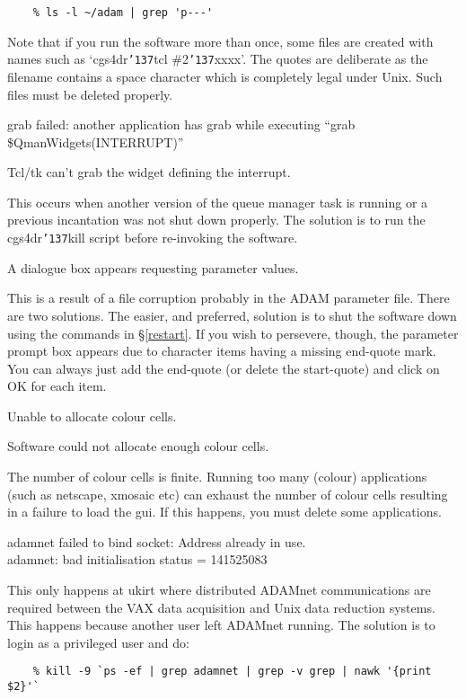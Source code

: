 \documentclass[a4paper]{book}
\renewcommand{\_}{{\tt\char'137}}
\begin{document}
\begin{description}
  \begin{verbatim}
    % ls -l ~/adam | grep 'p---'
  \end{verbatim}

  Note that if you run the software more than once, some files are created with names such as
  `cgs4dr\_tcl \#2\_xxxx'. The quotes are deliberate as the filename contains a space character
  which is completely legal under Unix. Such files must be deleted properly.

\item[{\bf \S}] {\sf grab failed: another application has grab while executing ``grab \$QmanWidgets(INTERRUPT)''}

  Tcl/tk can't grab the widget defining the interrupt.

  This occurs when another version of the queue manager task is running or a previous incantation was
  not shut down properly. The solution is to run the cgs4dr\_kill script before re-invoking the software.

\item[{\bf \S}] {\sf A dialogue box appears requesting parameter values.}

  This is a result of a file corruption probably in the ADAM parameter file.  There are two
  solutions. The easier, and preferred, solution is to shut the software down using the commands
  in \S \ref{restart}. If you wish to persevere, though, the parameter prompt box appears due to
  character items having a missing end-quote mark. You can always just add
  the end-quote (or delete the start-quote) and click on {\sf OK} for each item.

\item[{\bf \S}] {\sf Unable to allocate colour cells.}

  Software could not allocate enough colour cells.

  The number of colour cells is finite. Running too many (colour) applications (such as
  netscape, xmosaic etc) can exhaust the number of colour cells resulting in a failure
  to load the {\sc gui}. If this happens, you must delete some applications.

\item[{\bf \S}] {\sf adamnet failed to bind socket: Address already in use. \\
  adamnet: bad initialisation status = 141525083}

  This only happens at {\sc ukirt} where distributed ADAMnet communications are required
  between the VAX data acquisition and Unix data reduction systems. This happens because
  another user left ADAMnet running. The solution is to login as a privileged user and do:

  \begin{verbatim}
    % kill -9 `ps -ef | grep adamnet | grep -v grep | nawk '{print $2}'`
  \end{verbatim}
\end{description}
\end{document}
